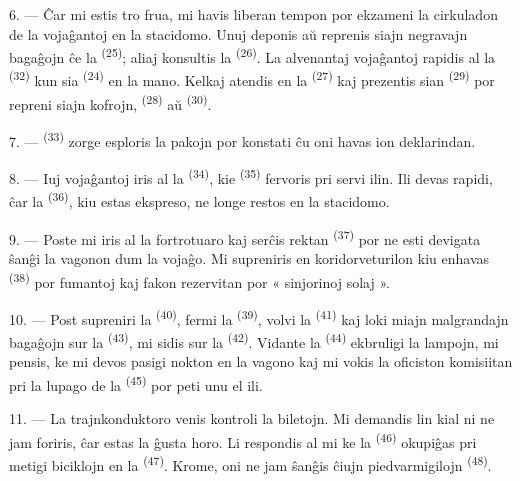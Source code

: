 6. --- Ĉar mi estis tro frua, mi havis liberan tempon por ekzameni la
cirkuladon de la vojaĝantoj en la stacidomo. Unuj deponis aŭ reprenis siajn
negravajn bagaĝojn ĉe la  \textsuperscript{(25)}; aliaj
konsultis la  \textsuperscript{(26)}. La alvenantaj vojaĝantoj
rapidis al la  \textsuperscript{(32)} kun sia 
\textsuperscript{(24)} en la mano. Kelkaj atendis en la
 \textsuperscript{(27)} kaj prezentis sian
 \textsuperscript{(29)} por repreni siajn kofrojn,
 \textsuperscript{(28)} aŭ 
\textsuperscript{(30)}.

7. ---  \textsuperscript{(33)} zorge esploris
la pakojn por konstati ĉu oni havas ion deklarindan.

8. --- Iuj vojaĝantoj iris al la  \textsuperscript{(34)}, kie
 \textsuperscript{(35)} fervoris pri servi ilin. Ili devas
rapidi, ĉar la  \textsuperscript{(36)}, kiu estas ekspreso, ne
longe restos en la stacidomo.

9. --- Poste mi iris al la fortrotuaro kaj serĉis rektan 
\textsuperscript{(37)} por ne esti devigata ŝanĝi la vagonon dum la vojaĝo. Mi
supreniris en koridorveturilon kiu enhavas 
\textsuperscript{(38)} por fumantoj kaj fakon rezervitan por « sinjorinoj
solaj ».

\VUsaut{3.0mm}

10. --- Post supreniri la  \textsuperscript{(40)}, fermi la
 \textsuperscript{(39)}, volvi la 
\textsuperscript{(41)} kaj loki miajn malgrandajn bagaĝojn sur la 
\textsuperscript{(43)}, mi sidis sur la  \textsuperscript{(42)}.
Vidante la  \textsuperscript{(44)} ekbruligi la lampojn, mi
pensis, ke mi devos pasigi nokton en la vagono kaj mi vokis la oficiston
komisiitan pri la lupago de la  \textsuperscript{(45)} por
peti unu el ili.

11. --- La trajnkonduktoro venis kontroli la biletojn. Mi demandis lin kial ni
ne jam foriris, ĉar estas la ĝusta horo. Li respondis al mi ke la
 \textsuperscript{(46)} okupiĝas pri metigi biciklojn en la
 \textsuperscript{(47)}. Krome, oni ne jam ŝanĝis ĉiujn
piedvarmigilojn \textsuperscript{(48)}.

